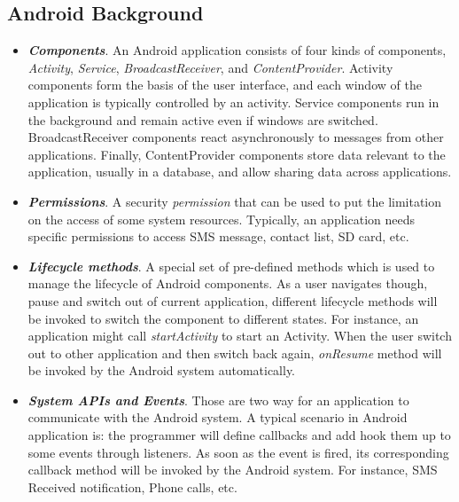 \documentclass{article}
\begin{document}
\subsection{Android Background}
\begin{itemize}
\item {\bf \emph{Components}}. An Android application consists of four kinds of components, 
\emph{Activity}, \emph{Service}, \emph{BroadcastReceiver}, and \emph{ContentProvider}.
Activity components form the basis of the user
  interface, and each window of the application is typically controlled by
  an activity. Service components run in the background and remain active even
  if windows are switched. 
BroadcastReceiver components react asynchronously to messages
  from other applications. Finally, ContentProvider components store data relevant to the
  application, usually in a database, and allow sharing  data across applications.

\item {\bf \emph{Permissions}}. A security \emph{permission} that can be used to 
put the limitation on the access of some system resources. Typically, an application
needs specific permissions to access SMS message, contact list, SD card, etc.

\item {\bf \emph{Lifecycle methods}}. A special set of pre-defined methods which is used 
to manage the lifecycle of Android components. As a user navigates though, pause and switch
out of current application, different lifecycle methods will be invoked to switch the 
component to different states. For instance, an application might call \emph{startActivity}
to start an Activity. When the user switch out to other application and then switch back again,
\emph{onResume} method will be invoked by the Android system automatically.  

\item {\bf \emph{System APIs and Events}}. Those are two way for an application to communicate
with the Android system. A typical scenario in Android application is: the programmer will define
callbacks and add hook them up to some events through listeners. As soon as the event is fired, 
its corresponding callback method will be invoked by the Android system. For instance, 
SMS Received notification, Phone calls, etc.

\end{itemize}
\end{document}
